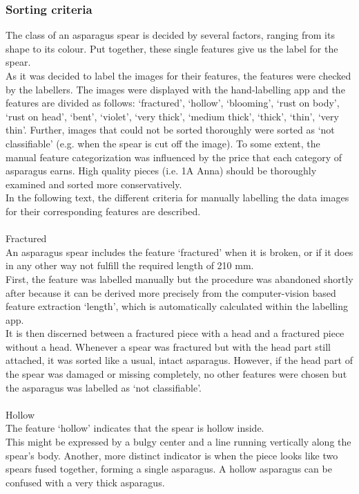 \subsubsection{Sorting criteria}

The class of an asparagus spear is decided by several factors, ranging from its shape to its colour. Put together, these single features give us the label for the spear. \\
As it was decided to label the images for their features, the features were checked by the labellers. The images were displayed with the hand-labelling app and the features are divided as follows: ‘fractured’, ‘hollow’, ‘blooming’, ‘rust on body’, ‘rust on head’, ‘bent’, ‘violet’, ‘very thick’, ‘medium thick’, ‘thick’, ‘thin’, ‘very thin’. Further, images that could not be sorted thoroughly were sorted as ‘not classifiable’ (e.g. when the spear is cut off the image). To some extent, the manual feature categorization was influenced by the price that each category of asparagus earns. High quality pieces (i.e. 1A Anna) should be thoroughly examined and sorted more conservatively. \\
In the following text, the different criteria for manually labelling the data images for their corresponding features are described. \\
 \\
Fractured \\
An asparagus spear includes the feature ‘fractured’ when it is broken, or if it does in any other way not fulfill the required length of 210 mm. \\
First, the feature was labelled manually but the procedure was abandoned shortly after because it can be derived  more precisely from the computer-vision based feature extraction ‘length’, which is automatically calculated within the labelling app. \\
It is then discerned between a fractured piece with a head and a fractured piece without a head. Whenever a spear was fractured but with the head part still attached, it was sorted like a usual, intact asparagus. However, if the head part of the spear was damaged or missing completely, no other features were chosen but the asparagus was labelled as ‘not classifiable’. \\
 \\
Hollow \\
The feature ‘hollow’ indicates that the spear is hollow inside. \\
This might be expressed by a bulgy center and a line running vertically along the spear’s body. Another, more distinct indicator is when the piece looks like two spears fused together, forming a single asparagus. A hollow asparagus can be confused with a very thick asparagus. \\
